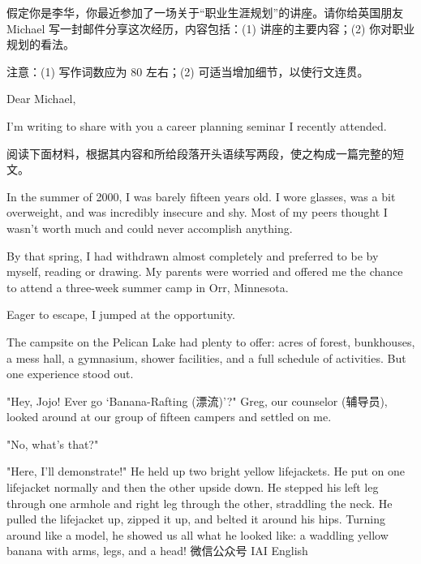 \documentclass{英语试卷}
\begin{document}
\par 假定你是李华，你最近参加了一场关于“职业生涯规划”的讲座。请你给英国朋友 Michael 写一封邮件分享这次经历，内容包括：(1) 讲座的主要内容；(2) 你对职业规划的看法。\par
\par 注意：(1) 写作词数应为 80 左右；(2) 可适当增加细节，以使行文连贯。\par
\par Dear Michael,\par
\par I'm writing to share with you a career planning seminar I recently attended.\par
{}
\par 阅读下面材料，根据其内容和所给段落开头语续写两段，使之构成一篇完整的短文。\par
\par In the summer of 2000, I was barely fifteen years old. I wore glasses, was a bit overweight, and was incredibly insecure and shy. Most of my peers thought I wasn't worth much and could never accomplish anything.\par
\par By that spring, I had withdrawn almost completely and preferred to be by myself, reading or drawing. My parents were worried and offered me the chance to attend a three-week summer camp in Orr, Minnesota.\par
\par Eager to escape, I jumped at the opportunity.\par
\par The campsite on the Pelican Lake had plenty to offer: acres of forest, bunkhouses, a mess hall, a gymnasium, shower facilities, and a full schedule of activities. But one experience stood out.\par
\par "Hey, Jojo! Ever go ‘Banana-Rafting (漂流)’?" Greg, our counselor (辅导员), looked around at our group of fifteen campers and settled on me.\par
\par "No, what's that?"\par
\par "Here, I’ll demonstrate!" He held up two bright yellow lifejackets. He put on one lifejacket normally and then the other upside down. He stepped his left leg through one armhole and right leg through the other, straddling the neck. He pulled the lifejacket up, zipped it up, and belted it around his hips. Turning around like a model, he showed us all what he looked like: a waddling yellow banana with arms, legs, and a head! 微信公众号 IAI English\par
\end{document}
